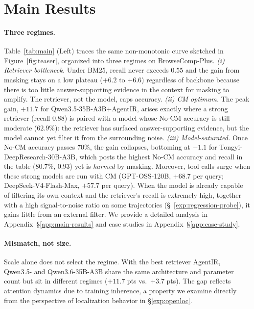
\section{Main Results}
\label{sec:regime}
\label{sec:results}

\paragraph{Three regimes.}
Table~\ref{tab:main} (Left) traces the same non-monotonic curve sketched in
Figure~\ref{fig:teaser}, organized into three regimes on BrowseComp-Plus.
\emph{(i) Retriever bottleneck.} Under BM25, recall never exceeds $0.55$ and
the gain from masking stays on a low plateau ($+6.2$ to $+6.6$) regardless of
backbone because there is too little answer-supporting evidence in the context for masking to amplify. The retriever, not the model, caps accuracy.
\emph{(ii) CM optimum.} The peak gain, $+11.7$ for Qwen3.5-35B-A3B+AgentIR, arises exactly where a strong retriever (recall $0.88$) is paired
with a model whose No-CM accuracy is still moderate ($62.9\%$): the retriever
has surfaced answer-supporting evidence, but the model cannot yet filter it from the surrounding noise.
\emph{(iii) Model-saturated.} Once No-CM accuracy passes $70\%$, the gain
collapses, bottoming at $-1.1$ for Tongyi-DeepResearch-30B-A3B, which posts the
highest No-CM accuracy and recall in the table ($80.7\%$, $0.93$) yet is
\emph{harmed} by masking. Moreover, tool calls surge when these strong models are run with CM (GPT-OSS-120B, $+$68.7 per query; DeepSeek-V4-Flash-Max, $+$57.7 per query). When the model is already capable of filtering its own
context and the retriever's recall is extremely high, together with a high signal-to-noise ratio on some trajectories (\S~\ref{exp:regression-probe}), it gains little from an external filter. We provide a detailed analysis in Appendix~\S\ref{app:main-results} and case studies in Appendix~\S\ref{app:case-study}.
 
\paragraph{Mismatch, not size.}
Scale alone does not select the regime. With the best retriever AgentIR, Qwen3.5- and Qwen3.6-35B-A3B share the same architecture and parameter count but sit in different regimes ($+11.7$ pts vs.\ $+3.7$ pts). The gap reflects attention dynamics due to training inherence, a property we examine directly from the perspective of localization behavior in \S\ref{exp:openloc}. 

